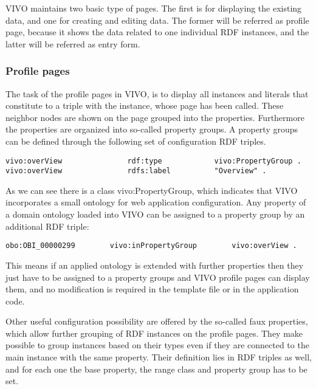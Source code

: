 VIVO maintains two basic type of pages. The first is for displaying the existing data, and one for creating and editing data. The former will be referred as profile page, because it shows the data related to one individual RDF instances, and the latter will be referred as entry form. 


\subsubsection{Profile pages} \label{vivoPp}

The task of the profile pages in VIVO, is to display all instances and literals that constitute to a triple with the instance, whose page has been called. These neighbor nodes are shown on the page grouped into the properties. Furthermore the properties are organized into so-called property groups. A property groups can be defined through the following set of configuration RDF triples. 

\begin{lstlisting}[captionpos=b, caption=Property group definition, label=jsListing, belowskip=1em, aboveskip=2em,
basicstyle=\footnotesize,frame=single]
vivo:overView				rdf:type			vivo:PropertyGroup .
vivo:overView				rdfs:label			"Overview" .
\end{lstlisting}

As we can see there is a class vivo:PropertyGroup, which indicates that VIVO incorporates a small ontology for web application configuration. Any property of a domain ontology loaded into VIVO can be assigned to a property group by an additional RDF triple:

\begin{lstlisting}[captionpos=b, caption=Assigning property to propery group, label=jsListing, belowskip=1em, aboveskip=2em,
basicstyle=\footnotesize,frame=single]
obo:OBI_00000299		vivo:inPropertyGroup 		vivo:overView .
\end{lstlisting}


This means if an applied ontology is extended with further properties then they just have to be assigned to a property groups and VIVO profile pages can display them, and no modification is required in the template file or in the application code.

Other useful configuration possibility are offered by the so-called faux properties, which allow further grouping of RDF instances on the profile pages. They make possible to group instances based on their types even if they are connected to the main instance with the same property. Their definition lies in RDF triples as well, and for each one the base property, the range class and property group has to be set.

